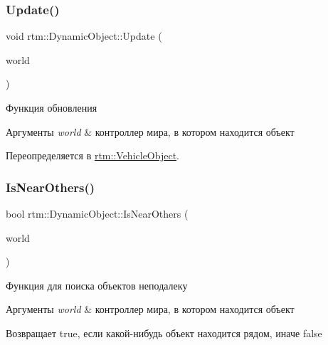 \subsubsection{\texorpdfstring{Update()}{Update()}}
{\footnotesize\ttfamily void rtm\+::\+Dynamic\+Object\+::\+Update (\begin{DoxyParamCaption}\item[{\hyperlink{classrtm_1_1_world_controller}{World\+Controller} $\ast$const}]{world }\end{DoxyParamCaption})\hspace{0.3cm}{\ttfamily [virtual]}}



Функция обновления 


\begin{DoxyParams}{Аргументы}
{\em world} & контроллер мира, в котором находится объект \\
\hline
\end{DoxyParams}


Переопределяется в \hyperlink{classrtm_1_1_vehicle_object_a1e089c8acf528660417a21c75658d546}{rtm\+::\+Vehicle\+Object}.

\mbox{\label{classrtm_1_1_dynamic_object_adcbb0baaad8ba2185e00221cc90fdee9}} 
\subsubsection{\texorpdfstring{Is\+Near\+Others()}{IsNearOthers()}}
{\footnotesize\ttfamily bool rtm\+::\+Dynamic\+Object\+::\+Is\+Near\+Others (\begin{DoxyParamCaption}\item[{\hyperlink{classrtm_1_1_world_controller}{World\+Controller} $\ast$const}]{world }\end{DoxyParamCaption})}



Функция для поиска объектов неподалеку 


\begin{DoxyParams}{Аргументы}
{\em world} & контроллер мира, в котором находится объект \\
\hline
\end{DoxyParams}
\begin{DoxyReturn}{Возвращает}
true, если какой-\/нибудь объект находится рядом, иначе false 
\end{DoxyReturn}
\mbox{\label{classrtm_1_1_dynamic_object_aceb38c6ff9d41d814953d4538e32542f}} 
